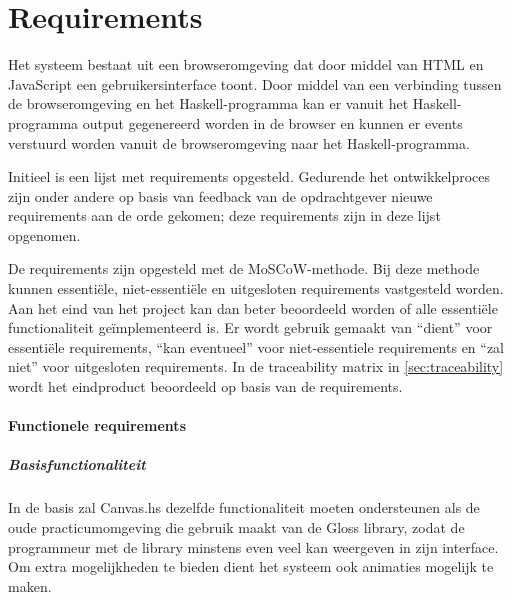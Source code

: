 \chapter{Requirements} \label{hoofdstuk:requirements}


Het systeem bestaat uit een browseromgeving dat door middel van HTML en JavaScript een gebruikersinterface toont. Door middel van een verbinding tussen de browseromgeving en het Haskell-programma kan er vanuit het Haskell-programma output gegenereerd worden in de browser en kunnen er events verstuurd worden vanuit de browseromgeving naar het Haskell-programma.

Initieel is een lijst met requirements opgesteld. Gedurende het ontwikkelproces zijn onder andere op basis van feedback van de opdrachtgever nieuwe requirements aan de orde gekomen; deze requirements zijn in deze lijst opgenomen.

De requirements zijn opgesteld met de MoSCoW-methode. Bij deze methode kunnen essenti\"ele, niet-essenti\"ele en uitgesloten requirements vastgesteld worden. Aan het eind van het project kan dan beter beoordeeld worden of alle essenti\"ele functionaliteit ge\"implementeerd is. Er wordt gebruik gemaakt van ``dient'' voor essenti\"ele requirements, ``kan eventueel'' voor niet-essentiele requirements en ``zal niet'' voor uitgesloten requirements. In de traceability matrix in \autoref{sec:traceability} wordt het eindproduct beoordeeld op basis van de requirements.

\subsubsection{Functionele requirements}
\paragraph{Basisfunctionaliteit} In de basis zal Canvas.hs dezelfde functionaliteit moeten ondersteunen als de oude practicumomgeving die gebruik maakt van de Gloss library, zodat de programmeur met de library minstens even veel kan weergeven in zijn interface. Om extra mogelijkheden te bieden dient het systeem ook animaties mogelijk te maken.

